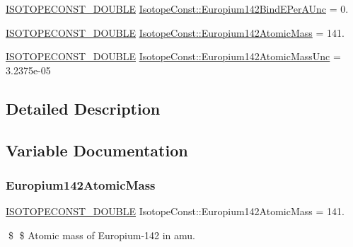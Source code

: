 \begin{DoxyCompactItemize}
\mbox{\hyperlink{group___isotope_const-_macros_ga8f45a7272ce02c0b4c65c44636ed719a}{I\+S\+O\+T\+O\+P\+E\+C\+O\+N\+S\+T\+\_\+\+D\+O\+U\+B\+LE}} \mbox{\hyperlink{group___isotope_const-_europium-_eu142_gaffffbc6203c61fddf85ef0e51bcdeada}{Isotope\+Const\+::\+Europium142\+Bind\+E\+Per\+A\+Unc}} = 0.
\item 
\mbox{\hyperlink{group___isotope_const-_macros_ga8f45a7272ce02c0b4c65c44636ed719a}{I\+S\+O\+T\+O\+P\+E\+C\+O\+N\+S\+T\+\_\+\+D\+O\+U\+B\+LE}} \mbox{\hyperlink{group___isotope_const-_europium-_eu142_ga7dbb332602eb5b081c6b99c5b6018808}{Isotope\+Const\+::\+Europium142\+Atomic\+Mass}} = 141.
\item 
\mbox{\hyperlink{group___isotope_const-_macros_ga8f45a7272ce02c0b4c65c44636ed719a}{I\+S\+O\+T\+O\+P\+E\+C\+O\+N\+S\+T\+\_\+\+D\+O\+U\+B\+LE}} \mbox{\hyperlink{group___isotope_const-_europium-_eu142_ga8a15a9f433a1508534f6b4bd7c811188}{Isotope\+Const\+::\+Europium142\+Atomic\+Mass\+Unc}} = 3.\+2375e-\/05
\end{DoxyCompactItemize}


\subsection{Detailed Description}


\subsection{Variable Documentation}
\mbox{\label{group___isotope_const-_europium-_eu142_ga7dbb332602eb5b081c6b99c5b6018808}} 
\subsubsection{\texorpdfstring{Europium142\+Atomic\+Mass}{Europium142AtomicMass}}
{\footnotesize\ttfamily \mbox{\hyperlink{group___isotope_const-_macros_ga8f45a7272ce02c0b4c65c44636ed719a}{I\+S\+O\+T\+O\+P\+E\+C\+O\+N\+S\+T\+\_\+\+D\+O\+U\+B\+LE}} Isotope\+Const\+::\+Europium142\+Atomic\+Mass = 141.}

\$ \$ Atomic mass of Europium-\/142 in amu. \mbox{\label{group___isotope_const-_europium-_eu142_ga8a15a9f433a1508534f6b4bd7c811188}} 
